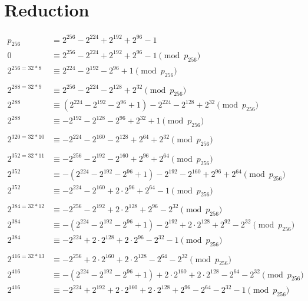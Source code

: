 \newpage
\section{Reduction}

\begin{align*}
p_{256} &= 2^{256} - 2^{224} + 2^{192} + 2^{96} - 1 \\
0 &\equiv 2^{256} - 2^{224} + 2^{192} + 2^{96} - 1 \pmod{p_{256}} \\
2^{256=32*8} &\equiv 2^{224} - 2^{192} - 2^{96} + 1 \pmod{p_{256}} \\
\\
2^{288=32*9} &\equiv 2^{256} - 2^{224} - 2^{128} + 2^{32} \pmod{p_{256}} \\
2^{288} &\equiv (2^{224} - 2^{192} - 2^{96} + 1) - 2^{224} - 2^{128} + 2^{32} \pmod{p_{256}} \\
2^{288} &\equiv - 2^{192} - 2^{128} - 2^{96} + 2^{32} + 1 \pmod{p_{256}} \\
\\
2^{320=32*10} &\equiv - 2^{224} - 2^{160} - 2^{128} + 2^{64} + 2^{32} \pmod{p_{256}} \\
\\
2^{352=32*11} &\equiv - 2^{256} - 2^{192} - 2^{160} + 2^{96} + 2^{64} \pmod{p_{256}} \\
2^{352} &\equiv - (2^{224} - 2^{192} - 2^{96} + 1) - 2^{192} - 2^{160} + 2^{96} + 2^{64} \pmod{p_{256}} \\
2^{352} &\equiv - 2^{224} - 2^{160} + 2\cdot 2^{96} + 2^{64} - 1 \pmod{p_{256}} \\
\\
2^{384=32*12} &\equiv - 2^{256} - 2^{192} + 2\cdot 2^{128} + 2^{96} - 2^{32} \pmod{p_{256}} \\
2^{384} &\equiv - (2^{224} - 2^{192} - 2^{96} + 1) - 2^{192} + 2\cdot 2^{128} + 2^{92} - 2^{32} \pmod{p_{256}} \\
2^{384} &\equiv - 2^{224} + 2\cdot 2^{128} + 2\cdot 2^{96} - 2^{32} - 1 \pmod{p_{256}} \\
\\
2^{416=32*13} &\equiv - 2^{256} + 2\cdot 2^{160} + 2\cdot 2^{128} - 2^{64} - 2^{32} \pmod{p_{256}} \\
2^{416} &\equiv - (2^{224} - 2^{192} - 2^{96} + 1) + 2\cdot 2^{160} + 2\cdot 2^{128} - 2^{64} - 2^{32} \pmod{p_{256}} \\
2^{416} &\equiv - 2^{224} + 2^{192} + 2\cdot 2^{160} + 2\cdot 2^{128} + 2^{96} - 2^{64} - 2^{32} - 1 \pmod{p_{256}} \\
\\

\end{align*}
